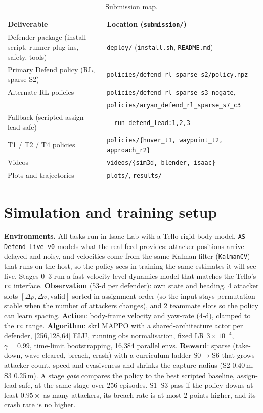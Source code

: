 \documentclass[10pt,a4paper]{article}
\begin{document}
\begin{table}[h]\centering\small
\begin{tabular}{@{}ll@{}}\toprule
Deliverable & Location (\texttt{submission/}) \\\midrule
Defender package (install script, runner plug-ins, safety, tools) & \texttt{deploy/} (\texttt{install.sh}, \texttt{README.md}) \\
Primary Defend policy (RL, sparse S2) & \texttt{policies/defend\_rl\_sparse\_s2/policy.npz} \\
Alternate RL policies & \texttt{policies/defend\_rl\_sparse\_s3\_nogate}, \\ & \texttt{policies/aryan\_defend\_rl\_sparse\_s7\_c3} \\
Fallback (scripted assign-lead-safe) & \texttt{-{}-run defend\_lead:1,2,3} \\
T1 / T2 / T4 policies & \texttt{policies/\{hover\_t1, waypoint\_t2, approach\_r2\}} \\
Videos & \texttt{videos/\{sim3d, blender, isaac\}} \\
Plots and trajectories & \texttt{plots/}, \texttt{results/} \\\bottomrule
\end{tabular}
\caption{Submission map.}\label{tab:deliv}
\end{table}

\section{Simulation and training setup}
\textbf{Environments.} All tasks run in Isaac Lab with a Tello rigid-body model.
\texttt{AS-Defend-Live-v0} models what the real feed provides: attacker positions arrive delayed and noisy,
and velocities come from the same Kalman filter (\texttt{KalmanCV}) that runs on the host, so the policy sees in
training the same estimates it will see live. Stages 0--3 run a fast velocity-level dynamics model that matches the
Tello's \texttt{rc} interface.
\textbf{Observation} (53-d per defender): own state and heading, 4 attacker slots
$[\Delta p, \Delta v, \text{valid}]$ sorted in assignment order (so the input stays permutation-stable when the number of attackers changes),
and 2 teammate slots so the policy can learn spacing.
\textbf{Action}: body-frame velocity and yaw-rate (4-d), clamped to the \texttt{rc} range.
\textbf{Algorithm}: skrl MAPPO with a shared-architecture actor per defender, [256,128,64] ELU, running obs
normalisation, fixed LR $3\!\times\!10^{-4}$, $\gamma{=}0.99$, time-limit bootstrapping, 16{,}384 parallel envs.
\textbf{Reward}: sparse (take-down, wave cleared, breach, crash) with a curriculum ladder S0$\to$S6 that grows
attacker count, speed and evasiveness and shrinks the capture radius (S2 0.40\,m, S3 0.25\,m).
A stage \emph{gate} compares the policy to the best scripted baseline, assign-lead-safe, at the same stage over 256 episodes.
S1--S3 pass if the policy downs at least $0.95\times$ as many attackers, its breach rate is at most 2 points higher, and its crash rate is no higher.
\end{document}
